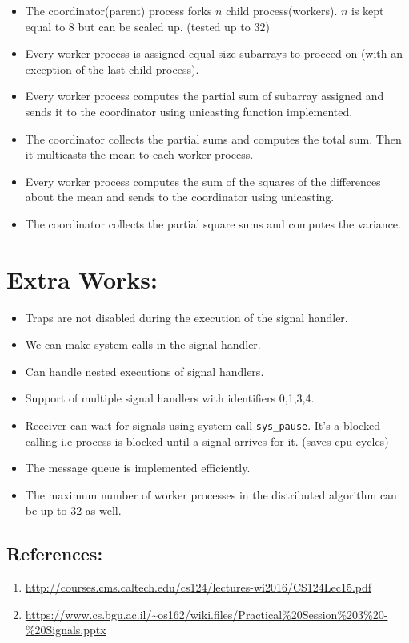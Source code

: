 \documentclass[a4 paper]{article}
\newcommand{\code}[1]{\texttt{#1}}
\begin{document}
\begin{itemize}
  \item The coordinator(parent) process forks $n$ child process(workers). $n$ is kept equal to 8 but can be scaled up. (tested up to $32$)
  \item Every worker process is assigned equal size subarrays to proceed on (with an exception of the last child process).
  \item Every worker process computes the partial sum of subarray assigned and sends it to the coordinator using unicasting function implemented.
  \item The coordinator collects the partial sums and computes the total sum. Then it multicasts the mean to each worker process.
  \item Every worker process computes the sum of the squares of the differences about the mean and sends to the coordinator using unicasting.
  \item The coordinator collects the partial square sums and computes the variance.
\end{itemize}
  
\section{Extra Works:}
\begin{itemize}
  \item Traps are not disabled during the execution of the signal handler.
  \item We can make system calls in the signal handler.
  \item Can handle nested executions of signal handlers.
  \item Support of multiple signal handlers with identifiers {0,1,3,4}.
  \item Receiver can wait for signals using system call \code{sys\_pause}. It's a blocked calling i.e process is blocked until a signal arrives for it. (saves cpu cycles)
  \item The message queue is implemented efficiently.
  \item The maximum number of worker processes in the distributed algorithm can be up to 32 as well.
\end{itemize}

\subsection*{References:}
\begin{enumerate}
  \item \url{http://courses.cms.caltech.edu/cs124/lectures-wi2016/CS124Lec15.pdf}
  \item \url{https://www.cs.bgu.ac.il/~os162/wiki.files/Practical%20Session%203%20-%20Signals.pptx}
\end{enumerate}
\end{document}
